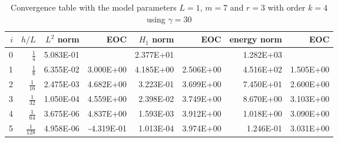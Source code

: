 \begin{table}
  \caption{\label{tab:ex1_order:c}Convergence table with the model parameters $L=1$, $m=7$ and $r=3$ with order $k=4$ using $ \gamma = 30$ }
  \begin{tabular}{rrrrrrrr}
    \hline\hline
    $i$&\textbf{$h/{L} $} & \textbf{$L^2$ norm} & \textbf{EOC} & \textbf{$H_1$ norm} & \textbf{EOC} & \textbf{energy norm} & \textbf{EOC} \\\hline
    0&$\frac{1}{4}$ & 5.083E-01 &  & 2.377E+01 &  & 1.282E+03 &  \\
    1&$\frac{1}{8}$ & 6.355E-02 & 3.000E+00 & 4.185E+00 & 2.506E+00 & 4.516E+02 & 1.505E+00 \\
    2&$\frac{1}{16}$ & 2.475E-03 & 4.682E+00 & 3.223E-01 & 3.699E+00 & 7.450E+01 & 2.600E+00 \\
    3&$\frac{1}{32}$ & 1.050E-04 & 4.559E+00 & 2.398E-02 & 3.749E+00 & 8.670E+00 & 3.103E+00 \\
    4&$\frac{1}{64}$ & 3.675E-06 & 4.837E+00 & 1.593E-03 & 3.912E+00 & 1.018E+00 & 3.090E+00 \\
    5&$\frac{1}{128}$ & 4.958E-06 & -4.319E-01 & 1.013E-04 & 3.974E+00 & 1.246E-01 & 3.031E+00 \\\hline\hline
  \end{tabular}
\end{table}

\newpage

